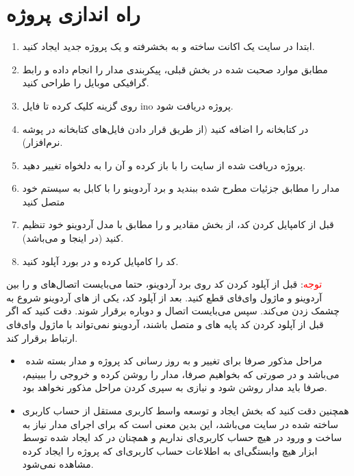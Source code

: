 \documentclass[12pt,a4paper]{article}
\begin{document}
\section{راه اندازی پروژه}
\begin{enumerate}
	\item
	ابتدا در سایت  یک اکانت ساخته و به بخشرفته و یک پروژه جدید ایجاد کنید.
	\item
	مطابق موارد صحبت شده در بخش قبلی، پیکربندی مدار را انجام داده و رابط گرافیکی موبایل را طراحی کنید.
	\item
	روی گزینه  کلیک کرده تا فایل ino پروژه دریافت شود.
	\item
	در  کتابخانه  را اضافه کنید (از طریق قرار دادن فایل‌های کتابخانه در پوشه  نرم‌افزار).
	\item
	پروژه دریافت شده از سایت را با  باز کرده و آن را به دلخواه تغییر دهید.
	\item
	مدار را مطابق جزئیات مطرح شده ببندید و برد آردوینو را با کابل  به سیستم خود متصل کنید
	\item
	قبل از کامپایل کردن کد، از بخش  مقادیر  و  را مطابق با مدل آردوینو خود تنظیم کنید (در اینجا  و  می‌باشد).
	\item
	کد را کامپایل کرده و در بورد آپلود کنید.
	
	
\end{enumerate}
\textcolor{red}{توجه}: 
قبل از آپلود کردن کد روی برد آردوینو، حتما می‌بایست اتصال‌های  و  را بین آردوینو و ماژول وای‌فای  قطع کنید. بعد از آپلود کد، یکی از  های آردوینو شروع به چشمک زدن می‌کند. سپس می‌بایست اتصال  و  دوباره برقرار شوند. دقت کنید که اگر قبل از آپلود کردن کد پایه های  و  متصل باشند، آردوینو نمی‌تواند با ماژول وای‌فای ارتباط برقرار کند.

\begin{itemize}
\item
‌ مراحل مذکور صرفا برای تغییر و به روز‌ رسانی کد پروژه و مدار بسته شده می‌باشد و در صورتی که بخواهیم صرفا، مدار را روشن کرده و خروجی را ببینیم، صرفا باید مدار روشن شود و نیازی به سپری کردن مراحل مذکور نخواهد بود.
\item
همچنین دقت کنید که بخش ایجاد و توسعه واسط کاربری مستقل از حساب کاربری ساخته شده در سایت می‌باشد، این بدین معنی است که برای اجرای مدار نیاز به ساخت و ورود در هیچ حساب کاربری‌ای نداریم و همچنان در کد ایجاد شده توسط ابزار هیچ وابستگی‌ای به اطلاعات حساب کاربری‌ای که پروژه را ایجاد کرده مشاهده نمی‌شود.
\end{itemize}
\end{document}
